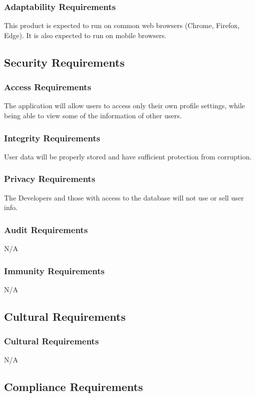 \documentclass[12pt]{article}
\begin{document}
\subsubsection{Adaptability Requirements}
This product is expected to run on common web browsers (Chrome, Firefox, Edge). It is also expected to run on mobile browsers.

\subsection{Security Requirements}


\subsubsection{Access Requirements}
The application will allow users to access only their own profile settings, while being able to view some of the information of other users.

\subsubsection{Integrity Requirements}
User data will be properly stored and have sufficient protection from corruption.
\subsubsection{Privacy Requirements}
The Developers and those with access to the database will not use or sell user info.

\subsubsection{Audit Requirements}
N/A

\subsubsection{Immunity Requirements}
N/A

\subsection{Cultural Requirements}

\subsubsection{Cultural Requirements}
N/A
\subsection{Compliance Requirements}
\end{document}
